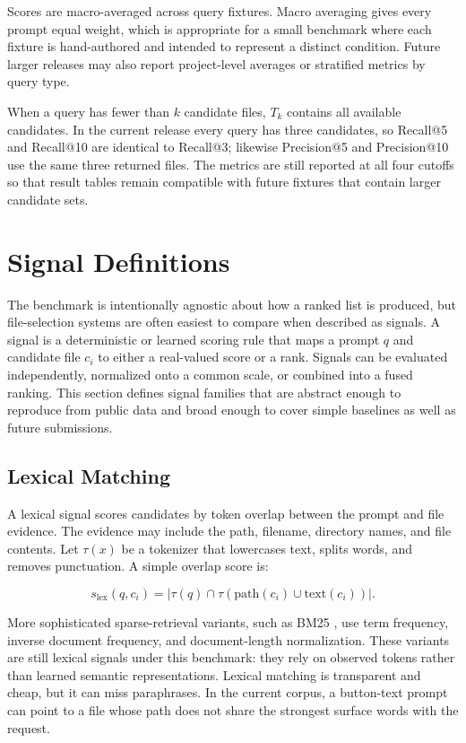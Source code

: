 \documentclass[11pt,a4paper]{article}
\begin{document}
Scores are macro-averaged across query fixtures. Macro averaging gives every
prompt equal weight, which is appropriate for a small benchmark where each
fixture is hand-authored and intended to represent a distinct condition. Future
larger releases may also report project-level averages or stratified metrics by
query type.

When a query has fewer than $k$ candidate files, $T_k$ contains all available
candidates. In the current release every query has three candidates, so
Recall@5 and Recall@10 are identical to Recall@3; likewise Precision@5 and
Precision@10 use the same three returned files. The metrics are still reported
at all four cutoffs so that result tables remain compatible with future
fixtures that contain larger candidate sets.

\section{Signal Definitions}

The benchmark is intentionally agnostic about how a ranked list is produced,
but file-selection systems are often easiest to compare when described as
signals. A signal is a deterministic or learned scoring rule that maps a prompt
$q$ and candidate file $c_i$ to either a real-valued score or a rank. Signals
can be evaluated independently, normalized onto a common scale, or combined into
a fused ranking. This section defines signal families that are abstract enough
to reproduce from public data and broad enough to cover simple baselines as well
as future submissions.

\subsection{Lexical Matching}

A lexical signal scores candidates by token overlap between the prompt and file
evidence. The evidence may include the path, filename, directory names, and file
contents. Let $\tau(x)$ be a tokenizer that lowercases text, splits words, and
removes punctuation. A simple overlap score is:

\[
s_{\mathrm{lex}}(q, c_i) =
\left|\tau(q) \cap \tau(\mathrm{path}(c_i) \cup \mathrm{text}(c_i))\right|.
\]

More sophisticated sparse-retrieval variants, such as BM25
\cite{robertson2009probabilistic}, use term frequency, inverse document
frequency, and document-length normalization. These variants are still lexical
signals under this benchmark: they rely on observed tokens rather than learned
semantic representations. Lexical matching is transparent and cheap, but it can
miss paraphrases. In the current corpus, a button-text prompt can point to a
file whose path does not share the strongest surface words with the request.
\end{document}
